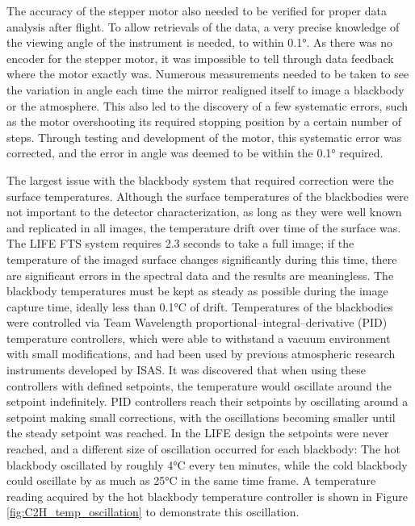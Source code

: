The accuracy of the stepper motor also needed to be verified for proper data analysis after flight. To allow retrievals of the data, a very precise knowledge of the viewing angle of the instrument is needed, to within 0.1°. As there was no encoder for the stepper motor, it was impossible to tell through data feedback where the motor exactly was. Numerous measurements needed to be taken to see the variation in angle each time the mirror realigned itself to image a blackbody or the atmosphere. This also led to the discovery of a few systematic errors, such as the motor overshooting its required stopping position by a certain number of steps. Through testing and development of the motor, this systematic error was corrected, and the error in angle was deemed to be within the 0.1° required.

The largest issue with the blackbody system that required correction were the surface temperatures. Although the surface temperatures of the blackbodies were not important to the detector characterization, as long as they were well known and replicated in all images, the temperature drift over time of the surface was. The LIFE FTS system requires 2.3 seconds to take a full image; if the temperature of the imaged surface changes significantly during this time, there are significant errors in the spectral data and the results are meaningless. The blackbody temperatures must be kept as steady as possible during the image capture time, ideally less than 0.1°C of drift. Temperatures of the blackbodies were controlled via Team Wavelength proportional–integral–derivative (PID) temperature controllers, which were able to withstand a vacuum environment with small modifications, and had been used by previous atmospheric research instruments developed by ISAS. It was discovered that when using these controllers with defined setpoints, the temperature would oscillate around the setpoint indefinitely. PID controllers reach their setpoints by oscillating around a setpoint making small corrections, with the oscillations becoming smaller until the steady setpoint was reached. In the LIFE design the setpoints were never reached, and a different size of oscillation occurred for each blackbody: The hot blackbody oscillated by roughly 4°C every ten minutes, while the cold blackbody could oscillate by as much as 25°C in the same time frame. A temperature reading acquired by the hot blackbody temperature controller is shown in Figure \ref{fig:C2H_temp_oscillation} to demonstrate this oscillation.

